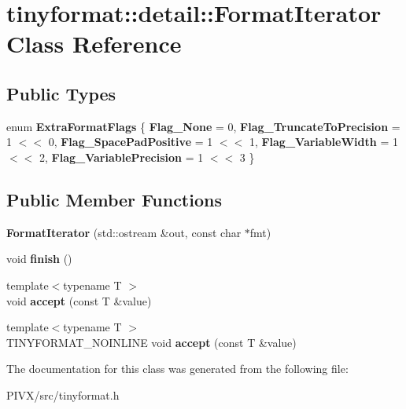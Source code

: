 \hypertarget{classtinyformat_1_1detail_1_1_format_iterator}{}\section{tinyformat\+:\+:detail\+:\+:Format\+Iterator Class Reference}
\label{classtinyformat_1_1detail_1_1_format_iterator}
\subsection*{Public Types}
\begin{DoxyCompactItemize}
\item 
\mbox{\label{classtinyformat_1_1detail_1_1_format_iterator_a219d15b3b08e2e2039043d2e992cc0b4}} 
enum {\bfseries Extra\+Format\+Flags} \{ \newline
{\bfseries Flag\+\_\+\+None} = 0, 
{\bfseries Flag\+\_\+\+Truncate\+To\+Precision} = 1 $<$$<$ 0, 
{\bfseries Flag\+\_\+\+Space\+Pad\+Positive} = 1 $<$$<$ 1, 
{\bfseries Flag\+\_\+\+Variable\+Width} = 1 $<$$<$ 2, 
\newline
{\bfseries Flag\+\_\+\+Variable\+Precision} = 1 $<$$<$ 3
 \}
\end{DoxyCompactItemize}
\subsection*{Public Member Functions}
\begin{DoxyCompactItemize}
\item 
\mbox{\label{classtinyformat_1_1detail_1_1_format_iterator_a798e0f475996df1b0a4f93540d96791b}} 
{\bfseries Format\+Iterator} (std\+::ostream \&out, const char $\ast$fmt)
\item 
\mbox{\label{classtinyformat_1_1detail_1_1_format_iterator_a46377a804f72dbad1e508d2fbaa18ce9}} 
void {\bfseries finish} ()
\item 
\mbox{\label{classtinyformat_1_1detail_1_1_format_iterator_a2a2b99ea3a371e1ff8d56d8c8b801bdb}} 
{\footnotesize template$<$typename T $>$ }\\void {\bfseries accept} (const T \&value)
\item 
\mbox{\label{classtinyformat_1_1detail_1_1_format_iterator_a914be2066071c01cac4c2ea867c9d89a}} 
{\footnotesize template$<$typename T $>$ }\\T\+I\+N\+Y\+F\+O\+R\+M\+A\+T\+\_\+\+N\+O\+I\+N\+L\+I\+NE void {\bfseries accept} (const T \&value)
\end{DoxyCompactItemize}


The documentation for this class was generated from the following file\+:\begin{DoxyCompactItemize}
\item 
P\+I\+V\+X/src/tinyformat.\+h\end{DoxyCompactItemize}
